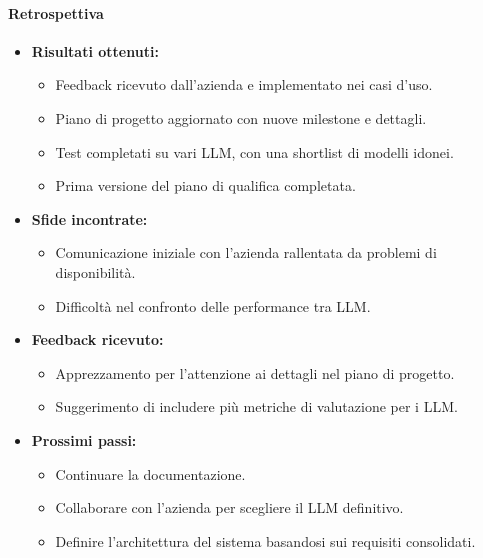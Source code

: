 \documentclass{article}
\begin{document}
                \paragraph{Retrospettiva}
                \begin{itemize}
                    \item \textbf{Risultati ottenuti:}
                    \begin{itemize}
                        \item Feedback ricevuto dall'azienda e implementato nei casi d'uso.
                        \item Piano di progetto aggiornato con nuove milestone e dettagli.
                        \item Test completati su vari LLM, con una shortlist di modelli idonei.
                        \item Prima versione del piano di qualifica completata.
                    \end{itemize}
                    \item \textbf{Sfide incontrate:}
                    \begin{itemize}
                        \item Comunicazione iniziale con l'azienda rallentata da problemi di disponibilità.
                        \item Difficoltà nel confronto delle performance tra LLM.
                    \end{itemize}
                    \item \textbf{Feedback ricevuto:}
                    \begin{itemize}
                        \item Apprezzamento per l'attenzione ai dettagli nel piano di progetto.
                        \item Suggerimento di includere più metriche di valutazione per i LLM.
                    \end{itemize}
                    \item \textbf{Prossimi passi:}
                    \begin{itemize}
                        \item Continuare la documentazione.
                        \item Collaborare con l'azienda per scegliere il LLM definitivo.
                        \item Definire l'architettura del sistema basandosi sui requisiti consolidati.
                    \end{itemize}
                \end{itemize}
\end{document}

